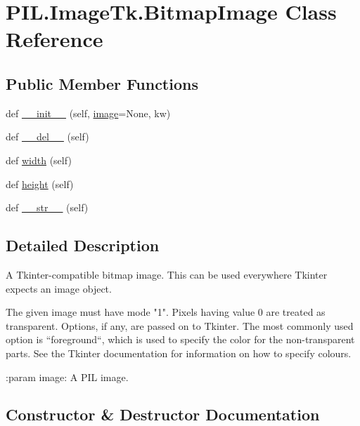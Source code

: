 \hypertarget{classPIL_1_1ImageTk_1_1BitmapImage}{}\section{P\+I\+L.\+Image\+Tk.\+Bitmap\+Image Class Reference}
\label{classPIL_1_1ImageTk_1_1BitmapImage}
\subsection*{Public Member Functions}
\begin{DoxyCompactItemize}
\item 
def \hyperlink{classPIL_1_1ImageTk_1_1BitmapImage_a5ca1e2933be8cc8f8c91b885a7454952}{\+\_\+\+\_\+init\+\_\+\+\_\+} (self, \hyperlink{namespacePIL_1_1ImageTk_aa639552cd8cb63f42e281f4f5358ed5f}{image}=None, kw)
\item 
def \hyperlink{classPIL_1_1ImageTk_1_1BitmapImage_a2eaa2c47b35064dde7bd6ddeeff75bb0}{\+\_\+\+\_\+del\+\_\+\+\_\+} (self)
\item 
def \hyperlink{classPIL_1_1ImageTk_1_1BitmapImage_ad50b3ca8484f81ea9f5270970e976a45}{width} (self)
\item 
def \hyperlink{classPIL_1_1ImageTk_1_1BitmapImage_ab1eac0fbb2820554a79a4a5ddc842f8b}{height} (self)
\item 
def \hyperlink{classPIL_1_1ImageTk_1_1BitmapImage_a48ba4c2df19887be63b3a84b3b86adfb}{\+\_\+\+\_\+str\+\_\+\+\_\+} (self)
\end{DoxyCompactItemize}


\subsection{Detailed Description}
\begin{DoxyVerb}A Tkinter-compatible bitmap image.  This can be used everywhere Tkinter
expects an image object.

The given image must have mode "1".  Pixels having value 0 are treated as
transparent.  Options, if any, are passed on to Tkinter.  The most commonly
used option is ``foreground``, which is used to specify the color for the
non-transparent parts.  See the Tkinter documentation for information on
how to specify colours.

:param image: A PIL image.
\end{DoxyVerb}
 

\subsection{Constructor \& Destructor Documentation}
\mbox{\label{classPIL_1_1ImageTk_1_1BitmapImage_a5ca1e2933be8cc8f8c91b885a7454952}} 
